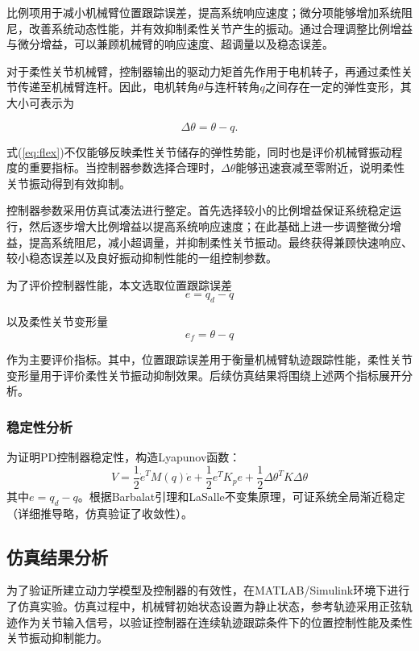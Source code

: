 \documentclass[12pt,hyperref,a4paper,UTF8]{ctexart}
\begin{document}
比例项用于减小机械臂位置跟踪误差，提高系统响应速度；微分项能够增加系统阻尼，改善系统动态性能，并有效抑制柔性关节产生的振动。通过合理调整比例增益与微分增益，可以兼顾机械臂的响应速度、超调量以及稳态误差。

对于柔性关节机械臂，控制器输出的驱动力矩首先作用于电机转子，再通过柔性关节传递至机械臂连杆。因此，电机转角$\theta$与连杆转角$q$之间存在一定的弹性变形，其大小可表示为

\begin{equation}
	\Delta\theta=\theta-q.
	\label{eq:flex}
\end{equation}

式(\ref{eq:flex})不仅能够反映柔性关节储存的弹性势能，同时也是评价机械臂振动程度的重要指标。当控制器参数选择合理时，$\Delta\theta$能够迅速衰减至零附近，说明柔性关节振动得到有效抑制。

控制器参数采用仿真试凑法进行整定。首先选择较小的比例增益保证系统稳定运行，然后逐步增大比例增益以提高系统响应速度；在此基础上进一步调整微分增益，提高系统阻尼，减小超调量，并抑制柔性关节振动。最终获得兼顾快速响应、较小稳态误差以及良好振动抑制性能的一组控制参数。

为了评价控制器性能，本文选取位置跟踪误差
\begin{equation}
	e=q_d-q
\end{equation}

以及柔性关节变形量
\begin{equation}
	e_f=\theta-q
\end{equation}

作为主要评价指标。其中，位置跟踪误差用于衡量机械臂轨迹跟踪性能，柔性关节变形量用于评价柔性关节振动抑制效果。后续仿真结果将围绕上述两个指标展开分析。

\subsubsection{稳定性分析}

为证明PD控制器稳定性，构造Lyapunov函数：
\[
V = \frac{1}{2} \dot{e}^T M(q) \dot{e} + \frac{1}{2} e^T K_p e + \frac{1}{2} \Delta\theta^T K \Delta\theta
\]
其中$e = q_d - q$。根据Barbalat引理和LaSalle不变集原理，可证系统全局渐近稳定（详细推导略，仿真验证了收敛性）。
\subsection{仿真结果分析}

为了验证所建立动力学模型及控制器的有效性，在MATLAB/Simulink环境下进行了仿真实验。仿真过程中，机械臂初始状态设置为静止状态，参考轨迹采用正弦轨迹作为关节输入信号，以验证控制器在连续轨迹跟踪条件下的位置控制性能及柔性关节振动抑制能力。
\end{document}

